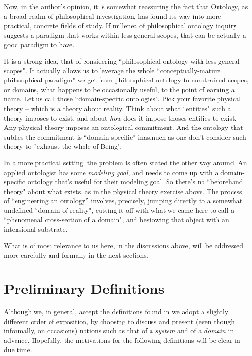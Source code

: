 \documentclass[12pt,a4paper]{article}
\begin{document}
Now, in the author's opinion, it is somewhat reassuring the fact that Ontology, as a broad realm of philosophical investigation, has found its way into more practical, concrete fields of study. If millenea of philosophical ontology inquiry suggests a paradigm that works within less general scopes, that can be actually a good paradigm to have. 

It is a strong idea, that of considering ``philosophical ontology with less general scopes". It actually allows us to leverage the whole ``conceptually-mature philosophical paradigm" we get from philosophical ontology to constrained scopes, or domains, what happens to be occasionally useful, to the point of earning a name. Let us call those ``domain-specific ontologies''. Pick your favorite physical theory -- which is a theory about reality. Think about what ``entities" such a theory imposes to exist, and about \textit{how} does it impose thoses entities to exist. Any physical theory imposes an ontological commitment. And the ontology that sublies the commitment is ``domain-specific'' inasmuch as one don't consider such theory to ``exhaust the whole of Being".

In a more practical setting, the problem is often stated the other way around. An applied ontologist has some \textit{modeling goal}, and needs to come up with a domain-specific ontology that's useful for their modeling goal. So there's no ``beforehand theory" about what exists, as in the physical theory exercise above. The process of ``engineering an ontology'' involves, precisely, jumping directly to a somewhat undefined ``domain of reality", cutting it off with what we came here to call a ``phenomenal cross-section of a domain", and bestowing that object with an intensional substrate. 

What is of most relevance to us here, in the discussions above, will be addressed more carefully and formally in the next sections.

\section{Preliminary Definitions}

Although we, in general, accept the definitions found in \citet{guarino2009} we adopt a slightly different order of exposition, by choosing to discuss and present (even though informally, on occasions) notions such as that of a \textit{system} and of a \textit{domain} in advance. Hopefully, the motivations for the following definitions will be clear in due time.
\end{document}
